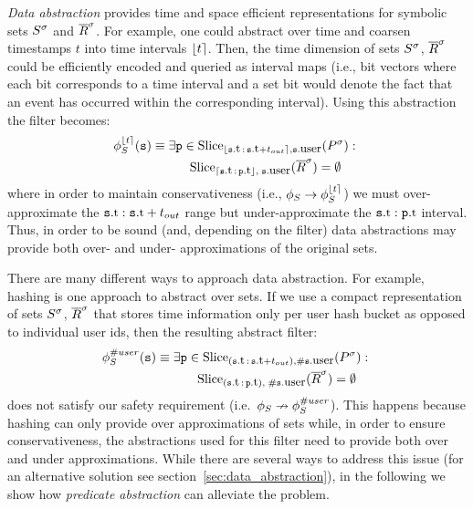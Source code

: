 \emph{Data abstraction} provides time and space efficient
representations for symbolic sets ${S}^{\sigma}$ and ${\overline{R}}^{\sigma}$.  
For example, one could
abstract over time and coarsen timestamps $t$ into time intervals
$\lfloor t \rceil$.  Then, the time dimension of sets ${S}^{\sigma}$, ${\overline{R}}^{\sigma}$ could
be efficiently encoded and queried as interval maps (i.e., bit vectors where
each bit corresponds to a time interval and a set bit would denote the fact that
an event has occurred within the corresponding interval).  Using this
abstraction the filter becomes:
\begin{align*}
\PrecedesP^{\interval{t}}(\symv{s}) 
&\equiv  
\exists \symv{p} \in 
\slice{\syms{P}}
{\interval{\facc{\symv{s}}{t}\,:\,\facc{\symv{s}}{t} + t_{out}},
	\facc{\symv{s}}{user}} :\ 
\\
&\qquad\quad
\slice{\syms{\oR}}
{\uinterval{\facc{\symv{s}}{t}\,:\,\facc{\symv{p}}{t}},\; 
	\facc{\symv{s}}{user}}
= \emptyset 
\end{align*}
where in order to maintain conservativeness (i.e.,
$\phi_{S} \rightarrow \phi_{S}^{\lfloor t \rceil} $) we must over-approximate
the $\facc{\symv{s}}{t}:\facc{\symv{s}}{t} + t_{out}$ range but
under-approximate the $\facc{\symv{s}}{t}:\facc{\symv{p}}{t}$ interval.  Thus,
in order to be sound (and, depending on the filter) data abstractions may
provide both over- and under- approximations of the original sets.


There are many different ways to approach data abstraction.  For example, 
hashing
is one approach to abstract over sets.  If we use a compact representation of
sets ${S}^{\sigma}$, ${\overline{R}}^{\sigma}$ that stores time information only per user hash
bucket as opposed to individual user ids, then the resulting abstract filter:
\begin{align*}
&
\PrecedesP^{\hashid{user}}(\symv{s}) \equiv 
\exists \symv{p} \in 
\slice{\syms{P}}
{(\facc{\symv{s}}{t}\,:\,\facc{\symv{s}}{t} + t_{out}),
	\hashid{\facc{\symv{s}}{user}}} :\ 
\\
&\qqquad\qquad\quad\;\,
\slice{\syms{\oR}}
{(\facc{\symv{s}}{t}\,:\,\facc{\symv{p}}{t}),\; 
	\hashid{\facc{\symv{s}}{user}}}
= \emptyset 
\end{align*}
does not satisfy our safety requirement 
(i.e.\ $\phi_{S} \nrightarrow \phi_{S}^{\# user}$).
This happens because hashing can only provide over approximations of sets while,
in order to ensure conservativeness, the abstractions used for this filter need
to provide both over and under approximations.
While there are several ways to address this issue (for an alternative solution 
see section~\ref{sec:data_abstraction}), 
in the following we show how {\em predicate abstraction} can alleviate the 
problem.


